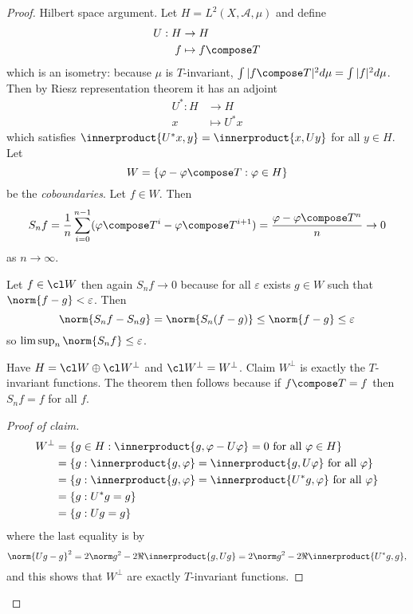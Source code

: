 \documentclass[a4paper]{article}
\newcommand*{\ip}{\innerproduct} %
\begin{document}
\begin{proof}
  Hilbert space argument. Let \(H = L^2(X, \mathcal A, \mu)\) and define
  \begin{align*}
    U: H &\to H \\
    f &\mapsto f \compose T
  \end{align*}
  which is an isometry: because \(\mu\) is \(T\)-invariant, \(\int |f \compose T|^2 d\mu = \int |f|^2 d\mu\). Then by Riesz representation theorem it has an adjoint
  \begin{align*}
    U^*: H &\to H \\
    x &\mapsto U^* x
  \end{align*}
  which satisfies \(\ip{U^*x, y} = \ip{x, Uy}\) for all \(y \in H\). Let
  \[
    W = \{\varphi- \varphi \compose T: \varphi \in H\}
  \]
  be the \emph{coboundaries}. Let \(f \in W\). Then
  \[
    S_nf = \frac{1}{n} \sum_{i = 0}^{n - 1} (\varphi \compose T^i - \varphi \compose T^{i + 1}) = \frac{\varphi - \varphi \compose T^n}{n} \to 0
  \]
  as \(n \to \infty\).

  Let \(f \in \cl W\) then again \(S_nf \to 0\) because for all \(\varepsilon\) exists \(g \in W\) such that \(\norm{f - g} < \varepsilon\). Then
  \[
    \norm{S_nf - S_ng}
    = \norm{S_n(f - g)}
    \leq \norm{f - g}
    \leq \varepsilon
  \]
  so \(\limsup_n \norm{S_nf} \leq \varepsilon\).

  Have \(H = \cl W \oplus \cl W^\perp\) and \(\cl W^\perp = W^\perp\). Claim \(W^\perp\) is exactly the \(T\)-invariant functions. The theorem then follows because if \(f \compose T = f\) then \(S_nf = f\) for all \(f\).

  \begin{proof}[Proof of claim]
    \begin{align*}
      W^\perp
      &= \{g \in H: \ip{g, \varphi - U\varphi} = 0 \text{ for all } \varphi \in H\} \\
      &= \{g: \ip{g, \varphi} = \ip{g, U\varphi} \text{ for all } \varphi\} \\
      &= \{g: \ip{g, \varphi} = \ip{U^*g, \varphi} \text{ for all } \varphi\} \\
      &= \{g: U^*g = g\} \\
      &= \{g: Ug = g\}
    \end{align*}
    where the last equality is by
    \[
      \norm{Ug - g}^2 = 2\norm g^2 - 2\Re \ip{g, Ug} = 2 \norm g^2 - 2 \Re \ip{U^*g, g},
    \]
    and this shows that \(W^\perp\) are exactly \(T\)-invariant functions.
  \end{proof}
\end{proof}
\end{document}
